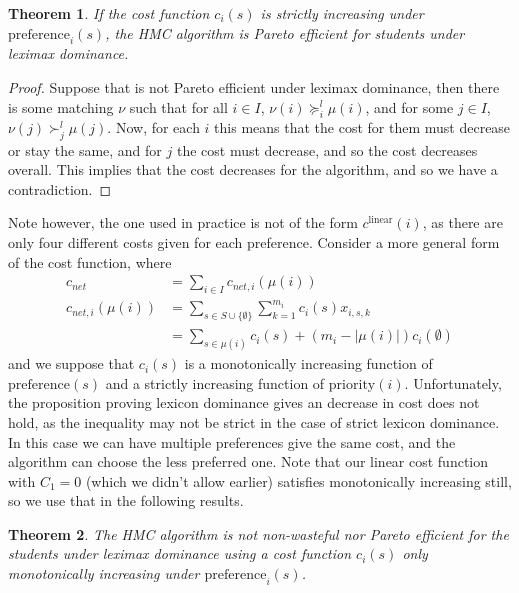 \documentclass[12pt,letterpaper]{extarticle}
\newtheorem{theo}{Theorem}
\begin{document}
\begin{theo}
If the cost function $c_i(s)$ is strictly increasing under $\mathrm{preference}_i(s)$, the HMC algorithm is Pareto efficient for students under leximax dominance.
\end{theo}

\begin{proof}
Suppose that is not Pareto efficient under leximax dominance, then there is some matching $\nu$ such that for all $i \in I$, $\nu(i) \succcurlyeq^l_i \mu(i)$, and for some $j \in I$, $\nu(j) \succ^l_j \mu(j)$. Now, for each $i$ this means that the cost for them must decrease or stay the same, and for $j$ the cost must decrease, and so the cost decreases overall. This implies that the cost decreases for the algorithm, and so we have a contradiction.
\end{proof}

Note however, the one used in practice is not of the form $c^{\mathrm{linear}}(i)$, as there are only four different costs given for each preference. Consider a more general form of the cost function, where
\begin{align*}
    c_{net} &= \sum_{i \in I} c_{net,i}(\mu(i)) \\
    c_{net,i}(\mu(i)) &= \sum_{s \in S\cup \{\emptyset\}} \sum_{k = 1}^{m_i} c_i(s)x_{i,s,k} \\
    &= \sum_{s \in \mu(i)} c_i(s) + (m_i - |\mu(i)|) c_i(\emptyset)
\end{align*}
and we suppose that $c_i(s)$ is a monotonically increasing function of $\mathrm{preference}(s)$ and a strictly increasing function of $\mathrm{priority}(i)$. Unfortunately, the proposition proving lexicon dominance gives an decrease in cost does not hold, as the inequality may not be strict in the case of strict lexicon dominance. In this case we can have multiple preferences give the same cost, and the algorithm can choose the less preferred one. Note that our linear cost function with $C_1 = 0$ (which we didn't allow earlier) satisfies monotonically increasing still, so we use that in the following results.

\begin{theo}
The HMC algorithm is not non-wasteful nor Pareto efficient for the students under leximax dominance using a cost function $c_i(s)$ only monotonically increasing under $\mathrm{preference}_i(s)$.
\end{theo}
\end{document}

